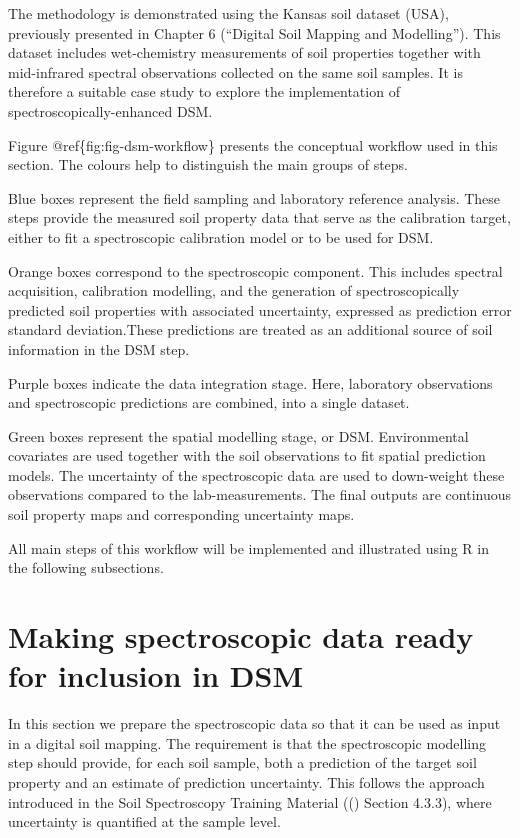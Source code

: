\documentclass[
  10pt,
  b5paper,
  oneside]{book}
\begin{document}
The methodology is demonstrated using the Kansas soil dataset (USA), previously presented in Chapter 6 (``Digital Soil Mapping and Modelling''). This dataset includes wet-chemistry measurements of soil properties together with mid-infrared spectral observations collected on the same soil samples. It is therefore a suitable case study to explore the implementation of spectroscopically-enhanced DSM.

Figure @ref\{fig:fig-dsm-workflow\} presents the conceptual workflow used in this section. The colours help to distinguish the main groups of steps.

{Blue boxes} represent the field sampling and laboratory reference analysis. These steps provide the measured soil property data that serve as the calibration target, either to fit a spectroscopic calibration model or to be used for DSM.

{Orange boxes} correspond to the spectroscopic component. This includes spectral acquisition, calibration modelling, and the generation of spectroscopically predicted soil properties with associated uncertainty, expressed as prediction error standard deviation.These predictions are treated as an additional source of soil information in the DSM step.

{Purple boxes} indicate the data integration stage. Here, laboratory observations and spectroscopic predictions are combined, into a single dataset.

{Green boxes} represent the spatial modelling stage, or DSM. Environmental covariates are used together with the soil observations to fit spatial prediction models. The uncertainty of the spectroscopic data are used to down-weight these observations compared to the lab-measurements. The final outputs are continuous soil property maps and corresponding uncertainty maps.

All main steps of this workflow will be implemented and illustrated using R in the following subsections.

\section{Making spectroscopic data ready for inclusion in DSM}\label{making-spectroscopic-data-ready-for-inclusion-in-dsm}

In this section we prepare the spectroscopic data so that it can be used as input in a digital soil mapping. The requirement is that the spectroscopic modelling step should provide, for each soil sample, both a prediction of the target soil property and an estimate of prediction uncertainty. This follows the approach introduced in the Soil Spectroscopy Training Material (() Section 4.3.3), where uncertainty is quantified at the sample level.
\end{document}
